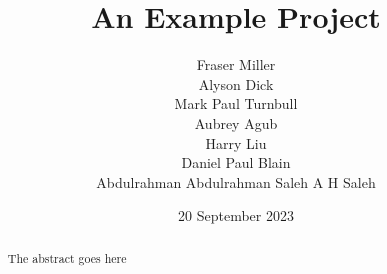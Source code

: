 



\title{An Example Project}

\author{Fraser Miller \\
        Alyson Dick \\
        Mark Paul Turnbull \\
        Aubrey Agub \\
        Harry Liu  \\
        Daniel Paul Blain  \\
        Abdulrahman Abdulrahman Saleh A H Saleh}

\date{20 September 2023}

\maketitle

\begin{abstract}

The abstract goes here

\end{abstract}

\educationalconsent

\newpage


